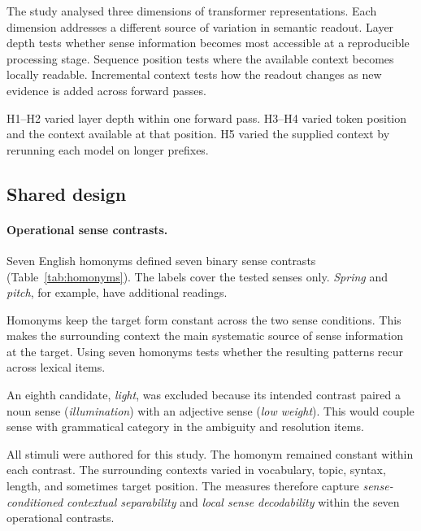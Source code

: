 \documentclass[conference]{IEEEtran}
\begin{document}
The study analysed three dimensions of transformer representations. Each
dimension addresses a different source of variation in semantic readout.
Layer depth tests whether sense information becomes most accessible at a
reproducible processing stage. Sequence position tests where the available
context becomes locally readable. Incremental context tests how the readout
changes as new evidence is added across forward passes.

H1--H2 varied layer depth within one forward pass. H3--H4 varied token position
and the context available at that position. H5 varied the supplied context by
rerunning each model on longer prefixes.

\subsection{Shared design}
\label{sec:shared-design}
\label{sec:data}

\paragraph{Operational sense contrasts.}
Seven English homonyms defined seven binary sense contrasts
(Table~\ref{tab:homonyms}). The labels cover the tested senses only.
\emph{Spring} and \emph{pitch}, for example, have additional readings.

Homonyms keep the target form constant across the two sense conditions. This
makes the surrounding context the main systematic source of sense information
at the target. Using seven homonyms tests whether the resulting patterns recur
across lexical items.

An eighth candidate, \emph{light}, was excluded because its intended contrast
paired a noun sense (\emph{illumination}) with an adjective sense
(\emph{low weight}). This would couple sense with grammatical category in the
ambiguity and resolution items.

All stimuli were authored for this study. The homonym remained constant within
each contrast. The surrounding contexts varied in vocabulary, topic, syntax,
length, and sometimes target position. The measures therefore capture
\emph{sense-conditioned contextual separability} and \emph{local sense
decodability} within the seven operational contrasts.
\end{document}
